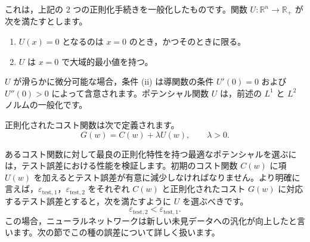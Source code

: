 \documentclass[dvipdfmx,a4paper]{jsarticle}%
\begin{document}
\begin{dfn}\label{def:elastic-net}
これは，上記の 2 つの正則化手続きを一般化したものです。関数 \(U:\mathbb{R}^{n}\to\mathbb{R}_{+}\) が次を満たすとします。
\begin{enumerate}\setlength\itemsep{0pt}
  \item \(U(x)=0\) となるのは \(x=0\) のとき，かつそのときに限る。
  \item \(U\) は \(x=0\) で大域的最小値を持つ。
\end{enumerate}
\(U\) が滑らかに微分可能な場合，条件 (ii) は導関数の条件 \(U'(0)=0\) および \(U''(0)>0\) によって含意されます。ポテンシャル関数 \(U\) は，前述の \(L^{1}\) と \(L^{2}\) ノルムの一般化です。

正則化されたコスト関数は次で定義されます。
\[
G(w)=C(w)+\lambda U(w), \qquad \lambda>0.
\]

あるコスト関数に対して最良の正則化特性を持つ最適なポテンシャルを選ぶには，テスト誤差における性能を検証します。初期のコスト関数 \(C(w)\) に項 \(U(w)\) を加えるとテスト誤差が有意に減少しなければなりません。より明確に言えば，\(\varepsilon_{\text{test},1}\)，\(\varepsilon_{\text{test},2}\) をそれぞれ \(C(w)\) と正則化されたコスト \(G(w)\) に対応するテスト誤差とすると，次を満たすように \(U\) を選ぶべきです。
\[
\varepsilon_{\text{test},2} < \varepsilon_{\text{test},1}.
\]
この場合，ニューラルネットワークは新しい未見データへの汎化が向上したと言います。次の節でこの種の誤差について詳しく扱います。
\end{dfn}
\end{document}
